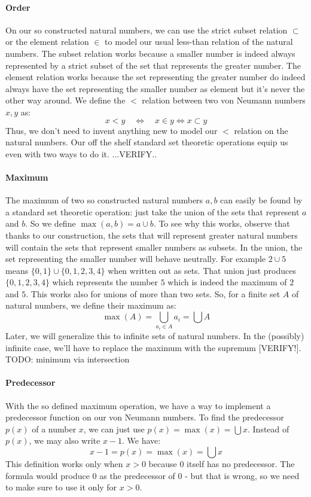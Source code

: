 \paragraph{Order}
On our so constructed natural numbers, we can use the strict subset relation $\subset$ or the element relation $\in$ to model our usual less-than relation of the natural numbers. The subset relation works because a smaller number is indeed always represented by a strict subset of the set that represents the greater number. The element relation works because the set representing the greater number do indeed always have the set representing the smaller number as element but it's never the other way around. We define the $<$ relation between two von Neumann numbers $x,y$ as:
\begin{equation}
x < y  \quad \Leftrightarrow \quad x \in y \Leftrightarrow x \subset y
\end{equation}
Thus, we don't need to invent anything new to model our $<$ relation on the natural numbers. Our off the shelf standard set theoretic operations equip us even with two ways to do it. ...VERIFY..

\paragraph{Maximum}
The maximum of two so constructed natural numbers $a,b$ can easily be found by a standard set theoretic operation: just take the union of the sets that represent $a$ and $b$. So we define $\max(a,b) = a \cup b$. To see why this works, observe that thanks to our construction, the sets that will represent greater natural numbers will contain the sets that represent smaller numbers as subsets. In the union, the set representing the smaller number will behave neutrally. For example $2 \cup 5$ means $\{0,1\} \cup \{0,1,2,3,4\}$ when written out as sets. That union just produces $\{0,1,2,3,4\}$ which represents the number $5$ which is indeed the maximum of $2$ and $5$. This works also for unions of more than two sets. So, for a finite set $A$ of natural numbers, we define their maximum as:
\begin{equation}
\max(A) = \bigcup_{a_i \in A} a_i = \bigcup A
\end{equation}
Later, we will generalize this to infinite sets of natural numbers. In the (possibly) infinite case, we'll have to replace the maximum with the supremum [VERIFY!]. TODO: minimum via intersection

\paragraph{Predecessor}
With the so defined maximum operation, we have a way to implement a predecessor function on our von Neumann numbers. To find the predecessor $p(x)$ of a number $x$, we can just use $p(x) = \max(x) = \bigcup x$. Instead of $p(x)$, we may also write $x-1$. We have:
\begin{equation}
x - 1 = p(x) = \max(x) = \bigcup x
\end{equation}
This definition works only when $x > 0$ because $0$ itself has no predecessor. The formula would produce $0$ as the predecessor of $0$ - but that is wrong, so we need to make sure to use it only for $x > 0$.

